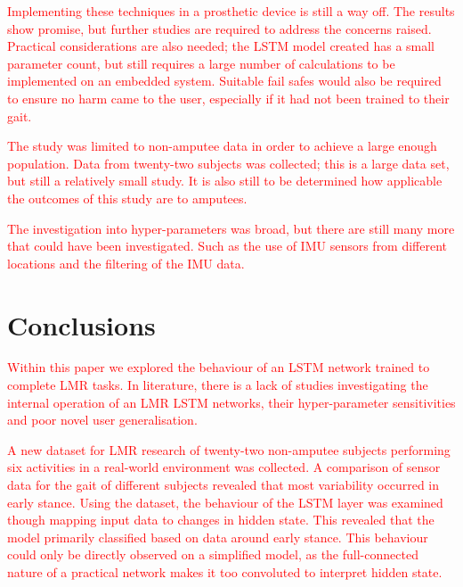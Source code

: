 \documentclass[sensors,article,submit,moreauthors,pdftex]{Definitions/mdpi}
\begin{document}
\textcolor{red}{Implementing these techniques in a prosthetic device is still a way off. The results show promise, but further studies are required to address the concerns raised. Practical considerations are also needed; the LSTM model created has a small parameter count, but still requires a large number of calculations to be implemented on an embedded system. Suitable fail safes would also be required to ensure no harm came to the user, especially if it had not been trained to their gait.}

\textcolor{red}{The study was limited to non-amputee data in order to achieve a large enough population. Data from twenty-two subjects was collected; this is a large data set, but still a relatively small study. It is also still to be determined how applicable the outcomes of this study are to amputees.}

\textcolor{red}{The investigation into hyper-parameters was broad, but there are still many more that could have been investigated. Such as the use of IMU sensors from different locations and the filtering of the IMU data.}


\section{Conclusions}
\label{sec:conclusion}
\textcolor{red}{Within this paper we explored the behaviour of an LSTM network trained to complete LMR tasks. In literature, there is a lack of studies investigating the internal operation of an LMR LSTM networks, their hyper-parameter sensitivities and poor novel user generalisation.}

\textcolor{red}{A new dataset for LMR research of twenty-two non-amputee subjects performing six activities in a real-world environment was collected. A comparison of sensor data for the gait of different subjects revealed that most variability occurred in early stance. Using the dataset, the behaviour of the LSTM layer was examined though mapping input data to changes in hidden state. This revealed that the model primarily classified based on data around early stance. This behaviour could only be directly observed on a simplified model, as the full-connected nature of a practical network makes it too convoluted to interpret hidden state.}
\end{document}
